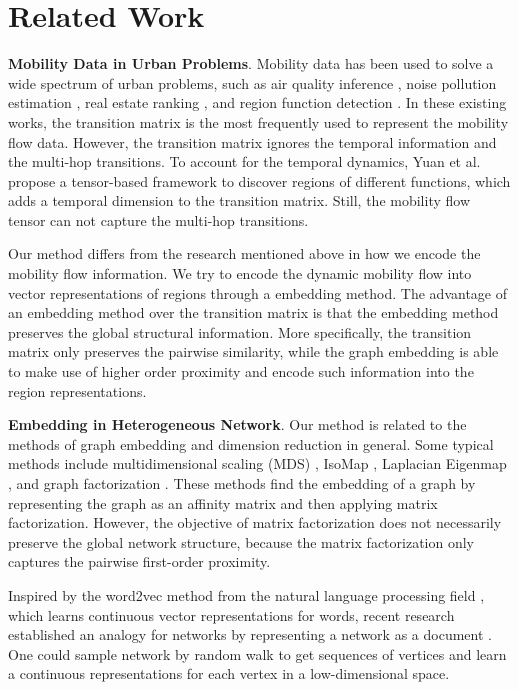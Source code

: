 \section{Related Work}
\label{ch3-sec:related}

\textbf{Mobility Data in Urban Problems}. Mobility data has been used to solve a wide spectrum of urban problems, such as air quality inference \cite{zheng2013u}, noise pollution estimation \cite{zheng2014diagnosing}, real estate ranking \cite{fu2014sparse}, and region function detection \cite{pan2013land,qi2011measuring}. In these existing works, the transition matrix is the most frequently used to represent the mobility flow data. However, the transition matrix ignores the temporal information and the multi-hop transitions. To account for the temporal dynamics, Yuan et al. \cite{yuan2012discovering} propose a tensor-based framework to discover regions of different functions, which adds a temporal dimension to the transition matrix. Still, the mobility flow tensor can not capture the multi-hop transitions.


 
Our method differs from the research mentioned above in how we encode the mobility flow information. We try to encode the dynamic mobility flow into vector representations of regions through a embedding method. The advantage of an embedding method over the transition matrix is that the embedding method preserves the global structural information. More specifically, the transition matrix only preserves the pairwise similarity, while the graph embedding is able to make use of higher order proximity and encode such information into the region representations.


\textbf{Embedding in Heterogeneous Network}. Our method is related to the methods of graph embedding and dimension reduction in general. Some typical methods include multidimensional scaling (MDS) \cite{cox2000multidimensional}, IsoMap \cite{tenenbaum2000global}, Laplacian Eigenmap \cite{belkin2001laplacian}, and graph factorization \cite{ahmed2013distributed}. These methods find the embedding of a graph by representing the graph as an affinity matrix and then applying matrix factorization. However, the objective of matrix factorization does not necessarily preserve the global network structure, because the matrix factorization only captures the pairwise first-order proximity. 

Inspired by the word2vec method from the natural language processing field \cite{mikolov2013linguistic, mikolov2013efficient, mikolov2013distributed}, which learns continuous vector representations for words, recent research established an analogy for networks by representing a network as a document \cite{perozzi2014deepwalk,tang2015line,grovernode2vec}. One could sample network by random walk to get sequences of vertices and learn a continuous representations for each vertex in a low-dimensional space.


